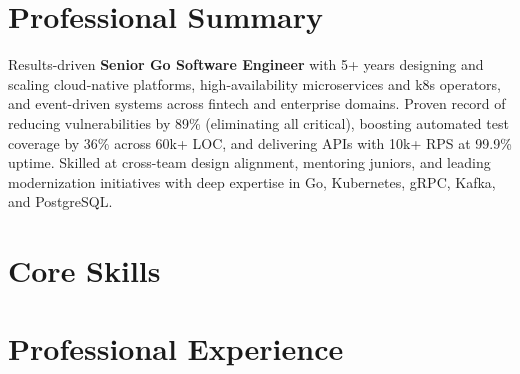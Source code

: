 \documentclass[10pt,a4paper,sans]{moderncv}
\begin{document}
\makecvtitle
\setlength{\hintscolumnwidth}{2.2cm} %
\renewcommand{\subsectionfont}{\normalsize\bfseries} %
\setlength{\parskip}{0.2em} %
\setlength{\parindent}{0pt}

\section{Professional Summary}
Results-driven \textbf{Senior Go Software Engineer} with 5+ years designing and scaling cloud-native platforms, high-availability microservices and k8s operators, and event-driven systems across fintech and enterprise domains. Proven record of reducing vulnerabilities by 89\% (eliminating all critical), boosting automated test coverage by 36\% across 60k+ LOC, and delivering APIs with 10k+ RPS at 99.9\% uptime. Skilled at cross-team design alignment, mentoring juniors, and leading modernization initiatives with deep expertise in Go, Kubernetes, gRPC, Kafka, and PostgreSQL.

\section{Core Skills}

\section{Professional Experience}
\end{document}
